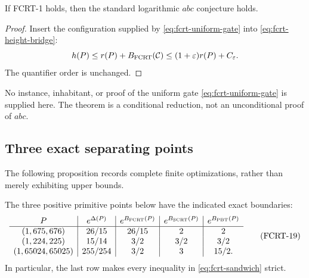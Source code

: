 \begin{theorem}
\label{thm:fcrt-implies-abc}
If \textup{FCRT-1} holds, then the standard logarithmic $abc$ conjecture
holds.
\end{theorem}

\begin{proof}
Insert the configuration supplied by \eqref{eq:fcrt-uniform-gate} into
\eqref{eq:fcrt-height-bridge}:
\[
 h(P)\le r(P)+B_{\rm FCRT}(\mathcal C)
       \le(1+\varepsilon)r(P)+C_\varepsilon.
\]
The quantifier order is unchanged.
\end{proof}

No instance, inhabitant, or proof of the uniform gate
\eqref{eq:fcrt-uniform-gate} is supplied here.  The theorem is a conditional
reduction, not an unconditional proof of $abc$.

\subsection{Three exact separating points}

The following proposition records complete finite optimizations, rather than
merely exhibiting upper bounds.

\begin{proposition}
\label{prop:fcrt-three-witnesses}
The three positive primitive points below have the indicated exact
boundaries:
\[
\begin{array}{c|c|c|c|c}
 P&e^{\Delta(P)}&e^{B_{\rm FCRT}(P)}
  &e^{B_{\rm SCRT}(P)}&e^{B_{\rm PBT}(P)}\\ \hline
 (1,675,676)&26/15&26/15&2&2\\
 (1,224,225)&15/14&3/2&3/2&3/2\\
 (1,65024,65025)&255/254&3/2&3&15/2.
\end{array}
\tag{FCRT-19}\label{eq:fcrt-three-witness-table}
\]
In particular, the last row makes every inequality in
\eqref{eq:fcrt-sandwich} strict.
\end{proposition}

